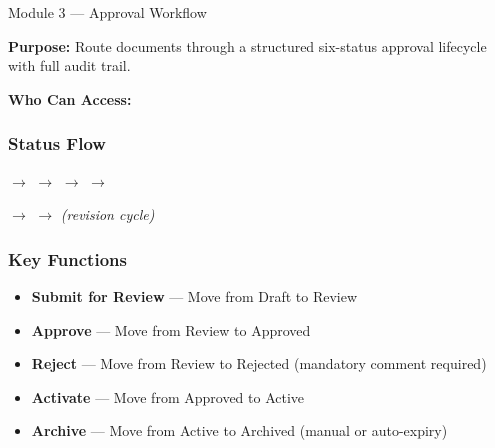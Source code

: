 \begin{ugModule}{Module 3 --- Approval Workflow}

  \textbf{Purpose:}
  Route documents through a structured six-status approval
  lifecycle with full audit trail.

  \textbf{Who Can Access:}
    

  \subsubsection*{Status Flow}
  \begin{center}
    \;$\longrightarrow$\;
    \;$\longrightarrow$\;
    \;$\longrightarrow$\;
    \;$\longrightarrow$\;
  \end{center}
  \begin{center}
    \;$\longrightarrow$\;
    \;$\longrightarrow$\;
    \quad\textit{(revision cycle)}
  \end{center}

  \subsubsection*{Key Functions}
  \begin{itemize}[leftmargin=18pt]
    \item \textbf{Submit for Review} --- Move from Draft to Review
    \item \textbf{Approve} --- Move from Review to Approved
    \item \textbf{Reject} --- Move from Review to Rejected
      (mandatory comment required)
    \item \textbf{Activate} --- Move from Approved to Active
    \item \textbf{Archive} --- Move from Active to Archived
      (manual or auto-expiry)
  \end{itemize}


\end{ugModule}
